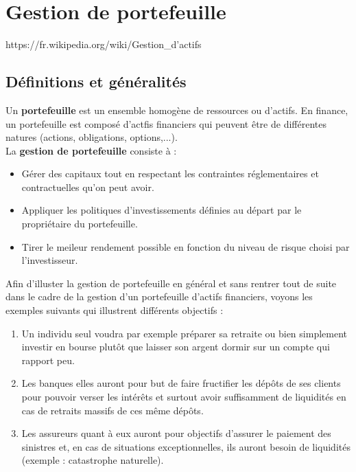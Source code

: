 \section{Gestion de portefeuille}
https://fr.wikipedia.org/wiki/Gestion\_d'actifs

\subsection{Définitions et généralités}

Un \textbf{portefeuille} est un ensemble homogène de ressources ou d'actifs. En finance, un portefeuille est composé d'actfis financiers qui peuvent être de différentes natures (actions, obligations, options,...).\\

La \textbf{gestion de portefeuille} consiste à :
\begin{itemize}
 \item Gérer des capitaux tout en respectant les contraintes réglementaires et contractuelles qu'on peut avoir.
 \item Appliquer les politiques d'investissements définies au départ par le propriétaire du portefeuille.
 \item Tirer le meileur rendement possible en fonction du niveau de risque choisi par l'investisseur.
\end{itemize}

Afin d'illuster la gestion de portefeuille en général et sans rentrer tout de suite dans le cadre de la gestion d'un portefeuille d'actifs financiers, voyons les exemples suivants qui illustrent différents objectifs :
\begin{enumerate}
 \item Un individu seul voudra par exemple préparer sa retraite ou bien simplement investir en bourse plutôt que laisser son argent dormir sur un compte qui rapport peu.
 \item Les banques elles auront pour but de faire fructifier les dépôts de ses clients pour pouvoir verser les intérêts et surtout avoir suffisamment de liquidités en cas de retraits massifs de ces même dépôts.
 \item Les assureurs quant à eux auront pour objectifs d'assurer le paiement des sinistres et, en cas de situations exceptionnelles, ils auront besoin de liquidités (exemple : catastrophe naturelle).
\end{enumerate}

